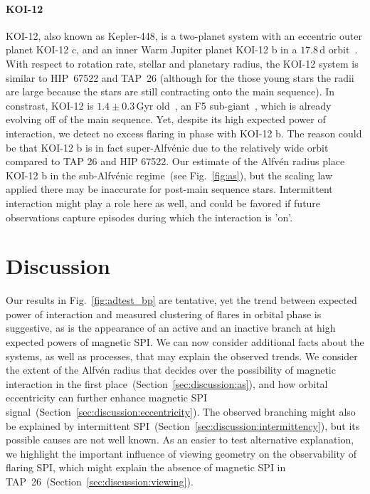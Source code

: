 \documentclass[twocolumn]{aastex631}
\begin{document}
\paragraph{KOI-12}
\label{sec:results:individualstars:koi12}
KOI-12, also known as Kepler-448, is a two-planet system with an eccentric outer planet KOI-12 c, and an inner Warm Jupiter planet KOI-12 b in a $17.8\,$d orbit~\citep{masuda2017eccentric}. With respect to rotation rate, stellar and planetary radius, the KOI-12 system is similar to HIP~67522 and TAP~26 (although for the those young stars the radii are large because the stars are still contracting onto the main sequence). In constrast, KOI-12 is $1.4\pm0.3\,$Gyr old~\citep{bourrier2015sophie}, an F5 sub-giant~\citep{frasca2016activity}, which is already evolving off of the main sequence. Yet, despite its high expected power of interaction, we detect no excess flaring in phase with KOI-12 b. The reason could be that KOI-12 b is in fact super-Alfv\'enic due to the relatively wide orbit compared to TAP 26 and HIP 67522. Our estimate of the Alfv\'en radius place KOI-12 b in the sub-Alfv\'enic regime~(see Fig.~\ref{fig:as}), but the scaling law applied there may be inaccurate for post-main sequence stars. Intermittent interaction might play a role here as well, and could be favored if future observations capture episodes during which the interaction is 'on'.




\section{Discussion}
\label{sec:discussion}

Our results in Fig.~\ref{fig:adtest_bp} are tentative, yet the trend between expected power of interaction and measured clustering of flares in orbital phase is suggestive, as is the appearance of an active and an inactive branch at high expected powers of magnetic SPI. We can now consider additional facts about the systems, as well as processes, that may explain the observed trends. We consider the extent of the Alfv\'en radius that decides over the possibility of magnetic interaction in the first place~(Section~\ref{sec:discussion:as}), and how orbital eccentricity can further enhance magnetic SPI signal~(Section~\ref{sec:discussion:eccentricity}). The observed branching might also be explained by intermittent SPI~(Section~\ref{sec:discussion:intermittency}), but its possible causes are not well known. As an easier to test alternative explanation, we highlight the important influence of viewing geometry on the observability of flaring SPI, which might explain the absence of magnetic SPI in TAP~26~(Section~\ref{sec:discussion:viewing}). 
\end{document}
